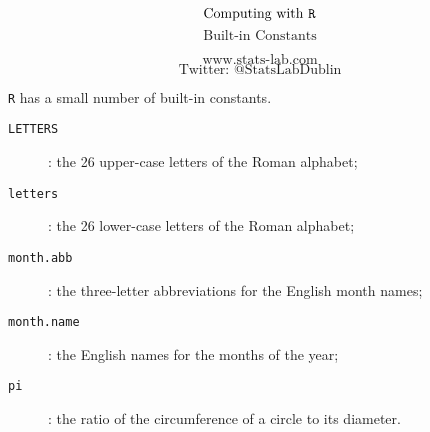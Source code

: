 \documentclass{beamer}
\begin{document}
\begin{frame}

\Huge

\[\mbox{Computing with \texttt{R}}\]
\LARGE
\[\mbox{Built-in Constants}\]

\Large
\[\mbox{www.stats-lab.com}\]
\[\mbox{Twitter: @StatsLabDublin}\]
\end{frame}

\begin{frame}

\texttt{R} has a small number of built-in constants.


\begin{description}
\item[\texttt{LETTERS}]: the 26 upper-case letters of the Roman alphabet;
\bigskip
\item[\texttt{letters}]: the 26 lower-case letters of the Roman alphabet;
\bigskip
\item[\texttt{month.abb}]: the three-letter abbreviations for the English month names;
\bigskip
\item[\texttt{month.name}]: the English names for the months of the year;
\bigskip
\item[\texttt{pi}]: the ratio of the circumference of a circle to its diameter.
\end{description}

\end{frame}
\end{document}
